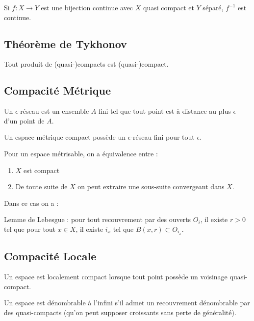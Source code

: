 \documentclass{cours}
\begin{document}
\begin{theorem}
    Si $f : X \rightarrow Y$ est une bijection continue avec $X$ quasi compact et $Y$ séparé, $f^{-1}$ est continue.
\end{theorem}

\subsection{Théorème de Tykhonov}
\begin{theorem}\label{thm:Tykhonov}
    Tout produit de (quasi-)compacts est (quasi-)compact.
\end{theorem}
\subsection{Compacité Métrique}
\begin{definition}
    Un $\epsilon$-réseau est un ensemble $A$ fini tel que tout point est à distance au plus $\epsilon$ d'un point de $A$.
\end{definition}

\begin{lemma}
    Un espace métrique compact possède un $\epsilon$-réseau fini pour tout $\epsilon$.    
\end{lemma}

\begin{theorem}
    Pour un espace métrisable, on a équivalence entre : 
    \begin{enumerate}
        \item $X$ est compact
        \item De toute suite de $X$ on peut extraire une sous-suite convergeant dans $X$.
    \end{enumerate}
    Dans ce cas on a : 
    \item Lemme de Lebesgue : pour tout recouvrement par des ouverts $O_{i}$, il existe $r > 0$ tel que pour tout $x \in X$, il existe $i_{x}$ tel que $B(x, r) \subset O_{i_{x}}$.
\end{theorem}

\subsection{Compacité Locale}
\begin{definition}
    Un espace est localement compact lorsque tout point possède un voisinage quasi-compact.
\end{definition}

\begin{definition}
    Un espace est dénombrable à l'infini s'il admet un recouvrement dénombrable par des quasi-compacts (qu'on peut supposer croissants sans perte de généralité). 
\end{definition}
\end{document}
